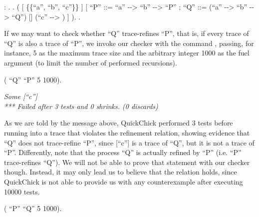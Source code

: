 \begin{coqdoccode}
	\coqdocnoindent
	  : .\coqdoceol
	\coqdocnoindent
	.\coqdoceol
	\coqdocindent{1.00em}
	 (\coqdoceol
	\coqdocindent{2.00em}
	\coqdoceol
	\coqdocindent{3.00em}
	[  \{\{``a'', ``b'', ``c''\}\} ]\coqdoceol
	\coqdocindent{3.00em}
	[ ``P'' ::= ``a'' -{}-> ``b'' -{}->  ``P'' ;\coqdoceol
	\coqdocindent{4.00em}
	``Q'' ::= (``a'' -{}-> ``b'' -{}->  ``Q'') [] (``c'' -{}-> ) ]\coqdoceol
	\coqdocindent{1.00em}
	).\coqdoceol
	\coqdocnoindent
	.\coqdoceol
\end{coqdoccode}

If we may want to check whether ``Q'' trace-refines ``P'', that is, if every trace of ``Q'' is also a trace of ``P'', we invoke our checker with the command , passing, for instance, 5 as the maximum trace size and the arbitrary integer 1000 as the fuel argument (to limit the number of performed recursions).

\begin{coqdoccode}
	\coqdocnoindent
	 (  ``Q'' ``P'' 5 1000).\coqdoceol
\end{coqdoccode}

\begin{tabbing}
	\emph{Some [``c'']} \\
	\emph{*** Failed after 3 tests and 0 shrinks. (0 discards)}
\end{tabbing}

As we are told by the message above, QuickChick performed 3 tests before running into a trace that violates the refinement relation, showing evidence that ``Q'' does not trace-refine ``P'', since [``c''] is a trace of ``Q'', but it is not a trace of ``P''. Differently, note that the process ``Q'' is actually refined by ``P'' (i.e. ``P'' trace-refines ``Q''). We will not be able to prove that statement with our checker though. Instead, it may only lead us to believe that the relation holds, since QuickChick is not able to provide us with any counterexample after executing 10000 tests.

\begin{coqdoccode}
	\coqdocnoindent
	 (  ``P'' ``Q'' 5 1000).\coqdoceol
\end{coqdoccode}

